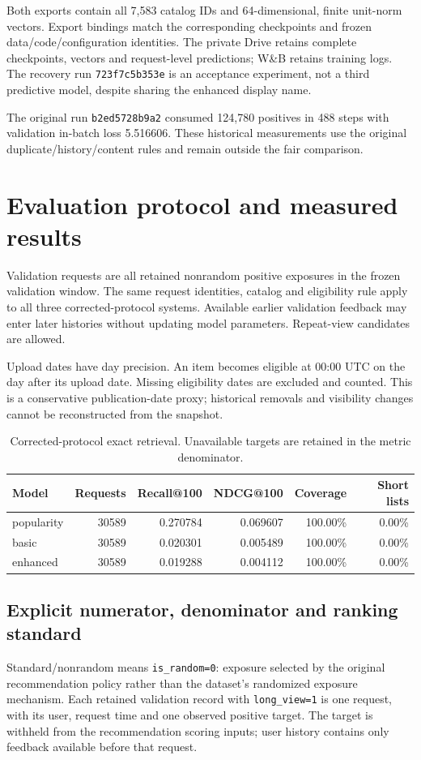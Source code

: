 \documentclass[11pt,a4paper]{article}
\begin{document}
Both exports contain all 7,583 catalog IDs and 64-dimensional, finite unit-norm vectors. Export bindings match the corresponding checkpoints and frozen data/code/configuration identities. The private Drive retains complete checkpoints, vectors and request-level predictions; W\&B retains training logs. The recovery run \texttt{723f7c5b353e} is an acceptance experiment, not a third predictive model, despite sharing the enhanced display name.

The original run \texttt{b2ed5728b9a2} consumed 124,780 positives in 488 steps with validation in-batch loss 5.516606. These historical measurements use the original duplicate/history/content rules and remain outside the fair comparison.
\clearpage
\section{Evaluation protocol and measured results}
Validation requests are all retained nonrandom positive exposures in the frozen validation window. The same request identities, catalog and eligibility rule apply to all three corrected-protocol systems. Available earlier validation feedback may enter later histories without updating model parameters. Repeat-view candidates are allowed.

Upload dates have day precision. An item becomes eligible at 00:00 UTC on the day after its upload date. Missing eligibility dates are excluded and counted. This is a conservative publication-date proxy; historical removals and visibility changes cannot be reconstructed from the snapshot.

\begin{table}[H]\centering\small\begin{tabular}{lrrrrr}\toprule
Model & Requests & Recall@100 & NDCG@100 & Coverage & Short lists\\\midrule
popularity & 30589 & 0.270784 & 0.069607 & 100.00\% & 0.00\% \\
basic & 30589 & 0.020301 & 0.005489 & 100.00\% & 0.00\% \\
enhanced & 30589 & 0.019288 & 0.004112 & 100.00\% & 0.00\% \\\bottomrule\end{tabular}
\caption{Corrected-protocol exact retrieval. Unavailable targets are retained in the metric denominator.}\end{table}

\subsection{Explicit numerator, denominator and ranking standard}
Standard/nonrandom means \texttt{is\_random=0}: exposure selected by the original recommendation policy rather than the dataset's randomized exposure mechanism. Each retained validation record with \texttt{long\_view=1} is one request, with its user, request time and one observed positive target. The target is withheld from the recommendation scoring inputs; user history contains only feedback available before that request.
\end{document}
